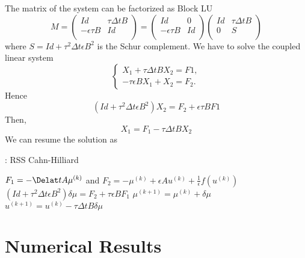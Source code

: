 \documentclass[11pt]{article}
\newcommand{\Frac}[2] {\frac{\textstyle #1} {\textstyle #2}}
\begin{document}
The matrix of the system can be factorized as Block LU
$$
M=\left(
\begin{array}{ll}
Id & \tau \Delta t B\\
-\epsilon \tau B & Id\\
\end{array}
\right)
=
\left(
\begin{array}{ll}
Id & 0\\
-\epsilon \tau B & Id\\
\end{array}
\right)
\left(
\begin{array}{ll}
Id & \tau \Delta t B\\
0& S\\
\end{array}
\right)
$$
where $S=Id+\tau^2\Delta t \epsilon B^2$ is the Schur complement. We have to solve the coupled linear system
$$
\left\{
\begin{array}{ll}
 X_1+\tau \Delta t B X_2=F1,\\
 -\tau \epsilon B X_1+X_2=F_2.
\end{array}
$$
Hence
$$
(Id +\tau^2 \Delta t \epsilon B^2)X_2=F_2+\epsilon \tau B F1
$$
Then,
$$
X_1=F_1-\tau \Delta t B X_2
$$
We can resume the solution as
\begin{center}
\begin{minipage}[H]{12cm}
  \begin{algorithm}[H]
    \caption{: RSS Cahn-Hilliard }\label{CH_RSS}
    \begin{algorithmic}[1]
            $F_1=-\Delat t A\mu^{(k)}$ and $F_2=-\mu^{(k)}+\epsilon Au^{(k)}+\Frac{1}{\epsilon}f(u^{(k)})$
              $ (Id +\tau^2 \Delta t \epsilon B^2)\delta\mu =F_2+\tau\epsilon B F_1$
               $\mu^{(k+1)}=\mu^{(k)}+\delta\mu$
                $ u^{(k+1)}=u^{(k)}-\tau \Delta t B \delta \mu$                         
            \EndFor
    \end{algorithmic}
    \end{algorithm}
\end{minipage}
\end{center}
%
%
\section{Numerical Results}
\end{document}
